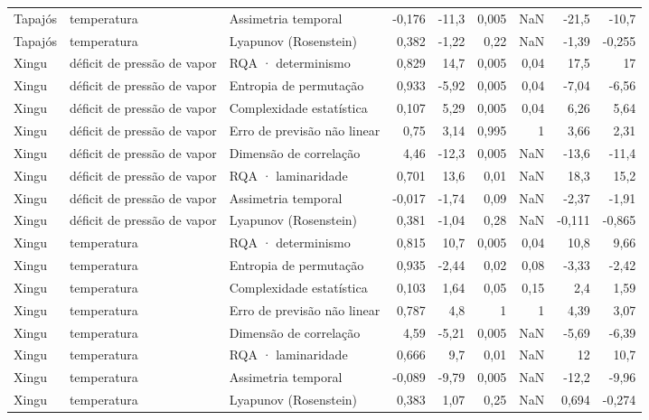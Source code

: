 \begin{table}
\begin{tabular}{lllrrrrrr}
Tapajós & temperatura & Assimetria temporal & -0,176 & -11,3 & 0,005 & NaN & -21,5 & -10,7 \\
Tapajós & temperatura & Lyapunov (Rosenstein) & 0,382 & -1,22 & 0,22 & NaN & -1,39 & -0,255 \\
Xingu & déficit de pressão de vapor & RQA · determinismo & 0,829 & 14,7 & 0,005 & 0,04 & 17,5 & 17 \\
Xingu & déficit de pressão de vapor & Entropia de permutação & 0,933 & -5,92 & 0,005 & 0,04 & -7,04 & -6,56 \\
Xingu & déficit de pressão de vapor & Complexidade estatística & 0,107 & 5,29 & 0,005 & 0,04 & 6,26 & 5,64 \\
Xingu & déficit de pressão de vapor & Erro de previsão não linear & 0,75 & 3,14 & 0,995 & 1 & 3,66 & 2,31 \\
Xingu & déficit de pressão de vapor & Dimensão de correlação & 4,46 & -12,3 & 0,005 & NaN & -13,6 & -11,4 \\
Xingu & déficit de pressão de vapor & RQA · laminaridade & 0,701 & 13,6 & 0,01 & NaN & 18,3 & 15,2 \\
Xingu & déficit de pressão de vapor & Assimetria temporal & -0,017 & -1,74 & 0,09 & NaN & -2,37 & -1,91 \\
Xingu & déficit de pressão de vapor & Lyapunov (Rosenstein) & 0,381 & -1,04 & 0,28 & NaN & -0,111 & -0,865 \\
Xingu & temperatura & RQA · determinismo & 0,815 & 10,7 & 0,005 & 0,04 & 10,8 & 9,66 \\
Xingu & temperatura & Entropia de permutação & 0,935 & -2,44 & 0,02 & 0,08 & -3,33 & -2,42 \\
Xingu & temperatura & Complexidade estatística & 0,103 & 1,64 & 0,05 & 0,15 & 2,4 & 1,59 \\
Xingu & temperatura & Erro de previsão não linear & 0,787 & 4,8 & 1 & 1 & 4,39 & 3,07 \\
Xingu & temperatura & Dimensão de correlação & 4,59 & -5,21 & 0,005 & NaN & -5,69 & -6,39 \\
Xingu & temperatura & RQA · laminaridade & 0,666 & 9,7 & 0,01 & NaN & 12 & 10,7 \\
Xingu & temperatura & Assimetria temporal & -0,089 & -9,79 & 0,005 & NaN & -12,2 & -9,96 \\
Xingu & temperatura & Lyapunov (Rosenstein) & 0,383 & 1,07 & 0,25 & NaN & 0,694 & -0,274 \\
\bottomrule
\end{tabular}
\end{table}
